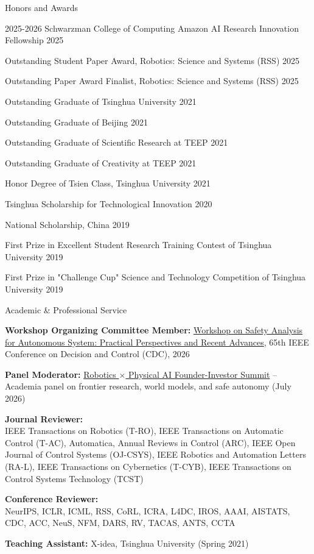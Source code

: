 \documentclass{resume} %
\begin{document}
	\begin{rSection}{Honors and Awards} {} \itemsep -2pt {}  
		\item 2025-2026 Schwarzman College of Computing Amazon AI Research Innovation Fellowship \hfill{2025}
		\item Outstanding Student Paper Award, Robotics: Science and Systems (RSS) \hfill{2025}
		\item Outstanding Paper Award Finalist, Robotics: Science and Systems (RSS) \hfill{2025}
		\item Outstanding Graduate of Tsinghua University \hfill{2021}
		\item Outstanding Graduate of Beijing \hfill{2021}
		\item Outstanding Graduate of Scientific Research at TEEP \hfill{2021}
		\item Outstanding Graduate of Creativity at TEEP \hfill{2021}
		\item Honor Degree of Tsien Class, Tsinghua University \hfill{2021}
		\item Tsinghua Scholarship for Technological Innovation \hfill{2020}
		\item National Scholarship, China \hfill{2019}
		\item First Prize in Excellent Student Research Training Contest of Tsinghua University \hfill{2019}
		\item First Prize in "Challenge Cup" Science and Technology Competition of Tsinghua University \hfill{2019}
	\end{rSection}

	\begin{rSection}{Academic \& Professional Service}
		\item \textbf{Workshop Organizing Committee Member:} \href{https://haowwang.github.io/cdc26_safety_workshop/}{Workshop on Safety Analysis for Autonomous System: Practical Perspectives and Recent Advances}, 65th IEEE Conference on Decision and Control (CDC), 2026
		\item \textbf{Panel Moderator:} \href{https://luma.com/u8j9b0a6}{Robotics $\times$ Physical AI Founder-Investor Summit} -- Academia panel on frontier research, world models, and safe autonomy (July 2026)
		\item \textbf{Journal Reviewer:} \\IEEE Transactions on Robotics (T-RO), IEEE Transactions on Automatic Control (T-AC), Automatica, Annual Reviews in Control (ARC), IEEE Open Journal of Control Systems (OJ-CSYS), IEEE Robotics and Automation Letters (RA-L), IEEE Transactions on Cybernetics (T-CYB), IEEE Transactions on Control Systems Technology (TCST)
		\item \textbf{Conference Reviewer:} \\NeurIPS, ICLR, ICML, RSS, CoRL, ICRA, L4DC, IROS, AAAI, AISTATS, CDC, ACC, NeuS, NFM, DARS, RV, TACAS, ANTS, CCTA
		\item \textbf{Teaching Assistant:} X-idea, Tsinghua University (Spring 2021)
	\end{rSection}
\end{document}
